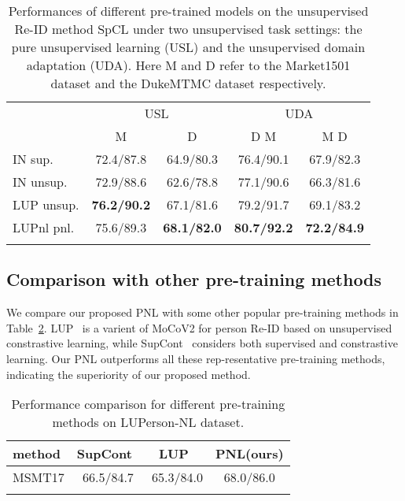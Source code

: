 \documentclass[10pt,twocolumn,letterpaper]{article}
\begin{document}
\begin{table}[t]
\small
    \centering
    \begin{tabular}{l|cc|cc}
    \shline
    \multirow{2}{*}{pre-train} & \multicolumn{2}{c|}{USL} & \multicolumn{2}{c}{UDA} \\ 
    \cline{2-5} & M & D & D  M & M  D \\ 
    \hline
    IN sup.    & 72.4/87.8 & 64.9/80.3 & 76.4/90.1 & 67.9/82.3 \\
    IN unsup.  & 72.9/88.6 & 62.6/78.8 & 77.1/90.6 & 66.3/81.6 \\
    LUP unsup. & \textbf{76.2/90.2} & 67.1/81.6 & 79.2/91.7 & 69.1/83.2 \\
    \hline
    LUPnl pnl. & 75.6/89.3 & \textbf{68.1/82.0} & \textbf{80.7/92.2} & \textbf{72.2/84.9} \\
    \shline
\end{tabular}
\caption{Performances of different pre-trained models on the unsupervised Re-ID method SpCL \cite{ge2020selfpaced} under two unsupervised task settings: the pure unsupervised learning (USL) and the unsupervised domain adaptation (UDA). Here M and D refer to the Market1501 dataset and the DukeMTMC dataset respectively.}
\label{tab:impor-unsup}
\end{table}

\subsection{Comparison with other pre-training methods}
We compare our proposed PNL with some other popular pre-training methods in Table~\ref{tab:com_method}. LUP~\cite{fu2020unsupervised} is a varient of MoCoV2 for person Re-ID based on unsupervised constrastive learning, while SupCont~\cite{khosla2020supervised} considers both supervised and constrastive learning. Our PNL outperforms all these rep-resentative pre-training methods, indicating the superiority of our proposed method.
\begin{table}[t]
\setlength{\tabcolsep}{2.6mm}
    \centering
    \vspace{-0.2cm}
    \begin{tabular}{l|c|c|c}
        \shline
       method  &  SupCont~\cite{khosla2020supervised} & LUP~\cite{fu2020unsupervised} & PNL(ours) \\
       \hline
       MSMT17  &  66.5/84.7 & 65.3/84.0 & 68.0/86.0 \\
       \shline
    \end{tabular}
\caption{Performance comparison for different pre-training methods on LUPerson-NL dataset.}
    \label{tab:com_method}
\end{table}
\end{document}
